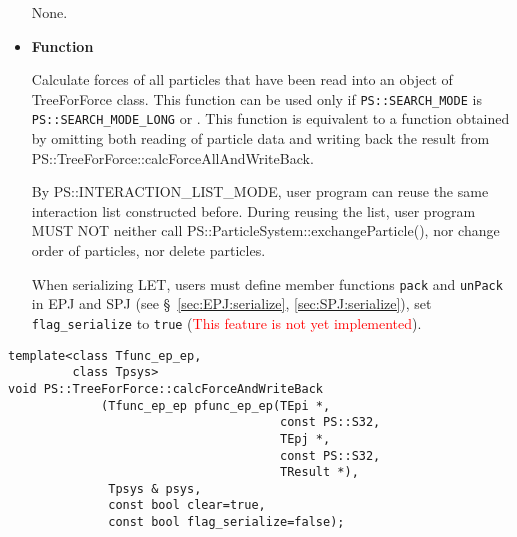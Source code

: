 \begin{itemize}
None.

\item {\bf Function}

Calculate forces of all particles that have been read into an object of TreeForForce class. This function can be used only if {\tt PS::SEARCH\_MODE} is {\tt PS::SEARCH\_MODE\_LONG} or . This function is equivalent to a function obtained by omitting both reading of particle data and writing back the result from PS::TreeForForce::calcForceAllAndWriteBack.

By PS::INTERACTION\_LIST\_MODE, user program can reuse the same interaction list constructed before. During reusing the list, user program MUST NOT neither call \newline  PS::ParticleSystem::exchangeParticle(), nor change order of particles, nor delete particles.

When serializing LET, users must define member functions \texttt{pack} and \texttt{unPack} in EPJ and SPJ (see \S~\ref{sec:EPJ:serialize}, \ref{sec:SPJ:serialize}), set \texttt{flag\_serialize} to \texttt{true} (\textcolor{red}{This feature is not yet implemented}).

\end{itemize}


\begin{screen}
\begin{verbatim}
template<class Tfunc_ep_ep,
         class Tpsys>
void PS::TreeForForce::calcForceAndWriteBack
             (Tfunc_ep_ep pfunc_ep_ep(TEpi *,
                                      const PS::S32,
                                      TEpj *,
                                      const PS::S32,
                                      TResult *),
              Tpsys & psys,
              const bool clear=true,
              const bool flag_serialize=false);
\end{verbatim}
\end{screen}

